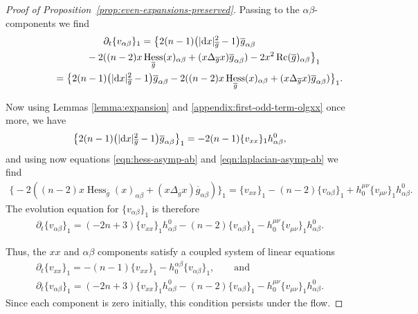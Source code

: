 \documentclass[pdftex]{sigma}
\numberwithin{equation}{section}
\newcommand{\del}{\partial}
\newcommand{\olg}{\overline{g}}
\newcommand{\gbar}{\overline{g}}
\DeclareMathOperator{\Rc}{Rc}
\DeclareMathOperator{\hess}{Hess}
\begin{document}
\begin{proof}[Proof of Proposition~\ref{prop:even-expansions-preserved}]
Passing to the $\alpha \beta$-components we find
\begin{gather*}
\del_t \{ v_{\alpha \beta} \}_{1} =\big\{ 2 (n-1) \big(|{\rm d}x|^2_{\gbar} -1\big) \olg_{{\alpha \beta}} \\
\hphantom{\del_t \{ v_{\alpha \beta} \}_{1} =}{} -2 ( (n-2) x \hess_{\olg} (x)_{{\alpha \beta}} + (x \Delta_{\olg} x) \olg_{{\alpha \beta}} ) -2 x^2 \Rc(\gbar)_{{\alpha \beta}}\big\}_1 \nonumber \\
\hphantom{\del_t \{ v_{\alpha \beta} \}_{1}}{} =\big\{ 2 (n-1)\big(|{\rm d}x|^2_{\gbar} -1\big)\olg_{{\alpha \beta}} -2 ( (n-2) x \hess_{\olg} (x)_{{\alpha \beta}} + (x \Delta_{\olg} x) \olg_{{\alpha \beta}} )\big\}_1.
\end{gather*}

Now using Lemmas \ref{lemma:expansion} and \ref{appendix:first-odd-term-olgxx} once more, we have
\begin{gather*}
\big\{ 2 (n-1) \big(|{\rm d}x|^2_{\gbar} -1\big) \olg_{{\alpha \beta}} \big\}_1 = -2(n-1)\{v_{xx}\}_1 h^0_{\alpha \beta},
\end{gather*}
and using now equations \eqref{eqn:hess-asymp-ab} and \eqref{eqn:laplacian-asymp-ab} we find
\begin{gather*}
\big\{{-}2 ((n-2) x \hess_{\olg} (x)_{{\alpha \beta}} + (x \Delta_{\olg} x) \olg_{{\alpha \beta}} ) \big\}_1 = \{v_{xx}\}_1 - (n-2) \{v_{\alpha \beta}\}_1 + h_0^{\mu \nu} \{v_{\mu\nu}\}_1 h^0_{\alpha \beta}.
\end{gather*}
The evolution equation for $\{v_{\alpha \beta}\}_1$ is therefore
\begin{gather*}
\del_t \{v_{\alpha \beta}\}_1 = (-2n+3)\{v_{xx}\}_1 h^0_{\alpha \beta} - (n-2) \{v_{\alpha \beta}\}_1 - h_0^{\mu \nu} \{v_{\mu\nu}\}_1 h^0_{\alpha \beta}.
\end{gather*}

Thus, the $xx$ and $\alpha\beta$ components satisfy a coupled system of linear equations
\begin{gather*}
\del_t \{ v_{xx} \}_{1} = -(n-1) \{v_{xx}\}_1 - h_0^{\alpha \beta} \{v_{\alpha \beta}\}_{1}, \qquad \mbox{and}\\
\del_t \{v_{\alpha \beta}\}_1 = (-2n+3)\{v_{xx}\}_1 h^0_{\alpha \beta} - (n-2) \{v_{\alpha \beta}\}_1 - h_0^{\mu \nu} \{v_{\mu\nu}\}_1 h^0_{\alpha \beta}.
\end{gather*}
Since each component is zero initially, this condition persists under the flow.


\end{proof}
\end{document}
